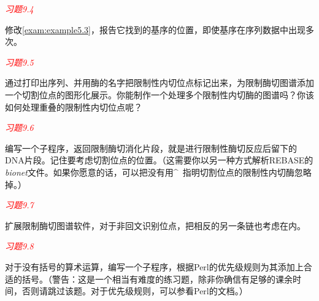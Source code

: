 \textcolor{red}{\textit{习题9.4}}
\begin{adjustwidth}{4em}{}
修改\autoref{exam:example5.3}，报告它找到的基序的位置，即使基序在序列数据中出现多次。
\end{adjustwidth}

\textcolor{red}{\textit{习题9.5}}
\begin{adjustwidth}{4em}{}
通过打印出序列、并用酶的名字把限制性内切位点标记出来，为限制酶切图谱添加一个切割位点的图形化展示。你能制作一个处理多个限制性内切酶的图谱吗？你该如何处理重叠的限制性内切位点呢？
\end{adjustwidth}

\textcolor{red}{\textit{习题9.6}}
\begin{adjustwidth}{4em}{}
编写一个子程序，返回限制酶切消化片段，就是进行限制性酶切反应后留下的DNA片段。记住要考虑切割位点的位置。（这需要你以另一种方式解析REBASE的\textit{bionet}文件。如果你愿意的话，可以把没有用\^~指明切割位点的限制性内切酶忽略掉。）
\end{adjustwidth}


\textcolor{red}{\textit{习题9.7}}
\begin{adjustwidth}{4em}{}
扩展限制酶切图谱软件，对于非回文识别位点，把相反的另一条链也考虑在内。
\end{adjustwidth}

\textcolor{red}{\textit{习题9.8}}
\begin{adjustwidth}{4em}{}
对于没有括号的算术运算，编写一个子程序，根据Perl的优先级规则为其添加上合适的括号。（警告：这是一个相当有难度的练习题，除非你确信有足够的课余时间，否则请跳过该题。对于优先级规则，可以参看Perl的文档。）
\end{adjustwidth}

